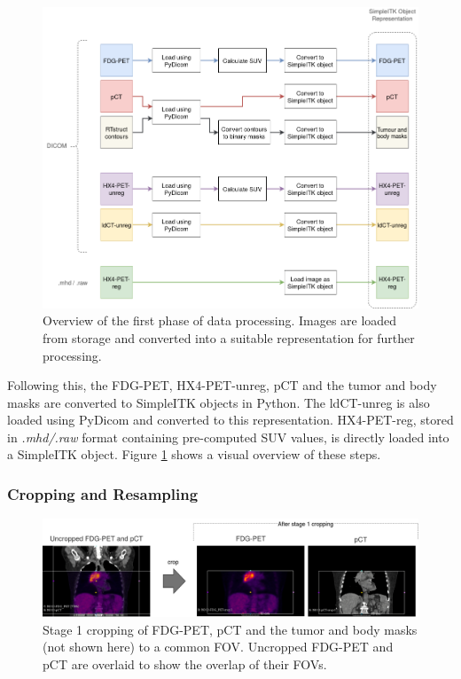 \begin{figure}[h!]
    \centering
    \includegraphics[width=0.9\linewidth]{figures/Data/data_processing_overview-step_1.png}
    \caption{Overview of the first phase of data processing. Images are loaded from storage and converted into a suitable representation for further processing.}
    \label{fig:data_proc_overview_1}
\end{figure}

Following this, the FDG-PET, HX4-PET-unreg, pCT and the tumor and body masks are converted to SimpleITK objects in Python. The ldCT-unreg is also loaded using PyDicom and converted to this representation. HX4-PET-reg, stored in \textit{.mhd/.raw} format containing pre-computed SUV values, is directly loaded into a SimpleITK object. Figure \ref{fig:data_proc_overview_1} shows a visual overview of these steps.


\subsubsection{Cropping and Resampling}
\begin{figure}[h!]
    \centering
    \includegraphics[width=\linewidth]{figures/Data/fdgpet_pct_crop1/N010-FDG_PET_pCT-uncropped_crop1.png}
    \caption{Stage 1 cropping of FDG-PET, pCT and the tumor and body masks (not shown here) to a common FOV. Uncropped FDG-PET and pCT are overlaid to show the overlap of their FOVs.}
    \label{fig:fdg_pet_pct_crop1}
\end{figure}

